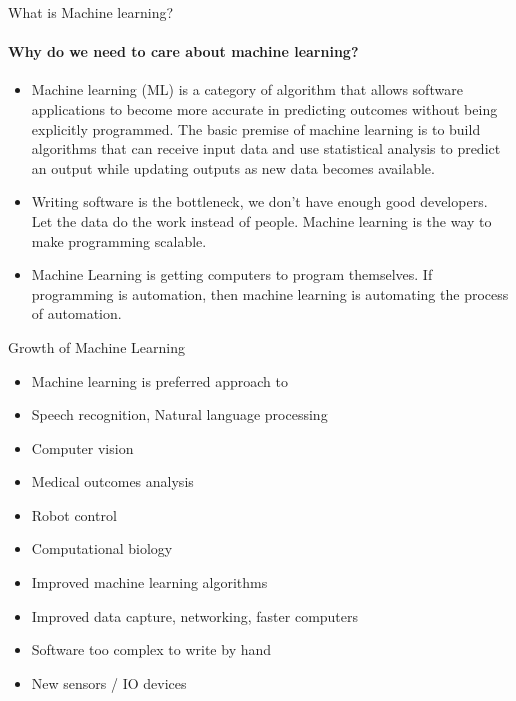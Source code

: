 \documentclass{beamer}
\begin{document}
\begin{frame}{What is Machine learning?}
\framesubtitle{Why do we need to care about machine learning?}
\begin{itemize}
    \item Machine learning (ML) is a category of algorithm that allows software applications to become more accurate in predicting outcomes without being explicitly programmed. The basic premise of machine learning is to build algorithms that can receive input data and use statistical analysis to predict an output while updating outputs as new data becomes available.
    \item Writing software is the bottleneck, we don’t have enough good developers. Let the data do the work instead of people. Machine learning is the way to make programming scalable.
    \item Machine Learning is getting computers to program themselves. If programming is automation, then machine learning is automating the process of automation.
\end{itemize}
\end{frame}
\begin{frame}{Growth of Machine Learning}
   \begin{itemize}
       \item Machine learning is preferred approach to
       \item Speech recognition, Natural language processing
       \item Computer vision
       \item Medical outcomes analysis
    \item Robot control
    \item Computational biology
    \item Improved machine learning algorithms
    \item Improved data capture, networking, faster computers
    \item Software too complex to write by hand
    \item New sensors / IO devices
\end{itemize}
\end{frame}
\end{document}
